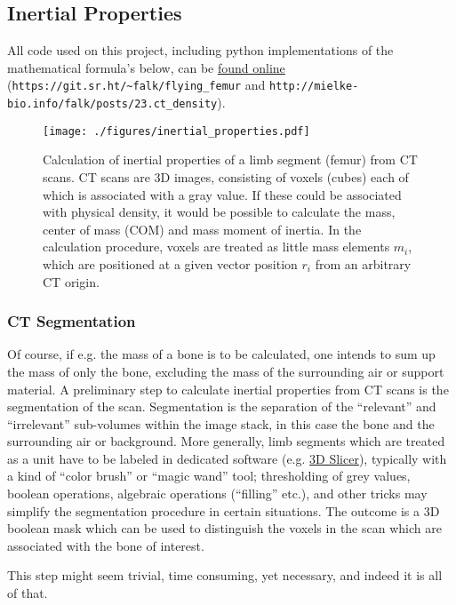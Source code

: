 \subsection{Inertial Properties}
\label{sec:org3dc7653}

All code used on this project, including python implementations of the mathematical formula's below, can be \href{https://git.sr.ht/\~falk/flying\_femur}{found online} (\nolinkurl{https://git.sr.ht/~falk/flying_femur} and \nolinkurl{http://mielke-bio.info/falk/posts/23.ct_density}).

\begin{figure}[htbp]
\centering
\texttt{[image: ./figures/inertial\_properties.pdf]}
\caption{\label{fig:inertials}Calculation of inertial properties of a limb segment (femur) from CT scans. CT scans are 3D images, consisting of voxels (cubes) each of which is associated with a gray value. If these could be associated with physical density, it would be possible to calculate the mass, center of mass (COM) and mass moment of inertia. In the calculation procedure, voxels are treated as little mass elements \(m_{i}\), which are positioned at a given vector position \(r_{i}\) from an arbitrary CT origin.}
\end{figure}

\subsubsection{CT Segmentation}
\label{sec:org0e36919}
Of course, if e.g. the mass of a bone is to be calculated, one intends to sum up the mass of only the bone, excluding the mass of the surrounding air or support material.
A preliminary step to calculate inertial properties from CT scans is the segmentation of the scan.
Segmentation is the separation of the ``relevant'' and ``irrelevant'' sub-volumes within the image stack, in this case the bone and the surrounding air or background.
More generally, limb segments which are treated as a unit have to be labeled in dedicated software (e.g. \href{https://www.slicer.org}{3D Slicer}), typically with a kind of ``color brush'' or ``magic wand'' tool; thresholding of grey values, boolean operations, algebraic operations (``filling'' etc.), and other tricks may simplify the segmentation procedure in certain situations.
The outcome is a 3D boolean mask which can be used to distinguish the voxels in the scan which are associated with the bone of interest.

This step might seem trivial, time consuming, yet necessary, and indeed it is all of that.


